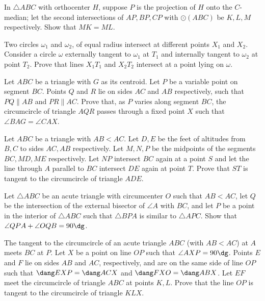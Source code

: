 \begin{probEG}
	In $\triangle ABC$ with orthocenter $H$, suppose $P$ is the projection of $H$ onto the $C$-median; let the second intersections of $AP,BP,CP$ with $\odot(ABC)$ be $K,L,M$ respectively. Show that $MK=ML$.
\end{probEG}

\begin{probEG}[EGMO 2016/4]
	Two circles $\omega_1$ and $\omega_2$, of equal radius intersect at different points $X_1$ and $X_2$. Consider a circle $\omega$ externally tangent to $\omega_1$ at $T_1$ and internally tangent to $\omega_2$ at point $T_2$. Prove that lines $X_1T_1$ and $X_2T_2$ intersect at a point lying on $\omega$.
\end{probEG}

\begin{probEG}
	Let $ABC$ be a triangle with $G$ as its centroid. Let $P$ be a variable point on segment $BC$. Points $Q$ and $R$ lie on sides $AC$ and $AB$ respectively, such that $PQ\parallel AB$ and $PR\parallel AC$. Prove that, as $P$ varies along segment $BC$, the circumcircle of triangle $AQR$ passes through a fixed point $X$ such that $\angle BAG=\angle CAX$.
\end{probEG}

\begin{probEG}
	Let $ABC$ be a triangle with $AB<AC$. Let $D,E$ be the feet of altitudes from $B,C$ to sides $AC,AB$ respectively. Let $M,N,P$ be the midpoints of the segments $BC,MD,ME$ respectively. Let $NP$ intersect $BC$ again at a point $S$ and let the line through $A$ parallel to $BC$ intersect $DE$ again at point $T$. Prove that $ST$ is tangent to the circumcircle of triangle $ADE$.
\end{probEG}

\begin{problem}
	Let $\triangle ABC$ be an acute triangle with circumcenter $O$ such that $AB<AC$, let $Q$ be the intersection of the external bisector of $\angle A$ with $BC$, and let $P$ be a point in the interior of $\triangle ABC$ such that $\triangle BPA$ is similar to $\triangle APC$. Show that $\angle QPA+\angle OQB=90\dg$.
\end{problem}

\begin{problem}
	The tangent to the circumcircle of an acute triangle $ABC$ (with $AB<AC$) at $A$ meets $BC$ at $P$. Let $X$ be a point on line $OP$ such that $\angle AXP=90\dg$. Points $E$ and $F$ lie on sides $AB$ and $AC$, respectively, and are on the same side of line $OP$ such that $\dang EXP=\dang ACX$ and $\dang FXO=\dang ABX $. Let $EF$ meet the circumcircle of triangle $ABC$ at points $K,L$. Prove that the line $OP$ is tangent to the circumcircle of triangle $KLX$.
\end{problem}

